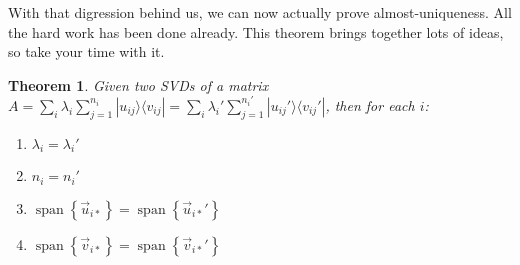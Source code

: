 \documentclass{amsbook}
\newtheorem{theorem}{Theorem}
\begin{document}
With that digression behind us, we can now actually prove almost-uniqueness.  All the hard work has been done already.  This theorem brings together lots of ideas, so take your time with it.

\begin{theorem}
Given two SVDs of a matrix $A=\sum_i\lambda_i\sum_{j=1}^{n_i}|u_{ij}\rangle\langle v_{ij}|=\sum_i\lambda_i'\sum_{j=1}^{n_i'}|u_{ij}'\rangle\langle v_{ij}'|$, then for each $i$:

\begin{enumerate}
\item $\lambda_i=\lambda_i'$
\item $n_i=n_i'$
\item $\operatorname{span}\left\{\vec u_{i*}\right\}=\operatorname{span}\left\{\vec u_{i*}'\right\}$
\item $\operatorname{span}\left\{\vec v_{i*}\right\}=\operatorname{span}\left\{\vec v_{i*}'\right\}$
\end{enumerate}
\end{theorem}
\end{document}
